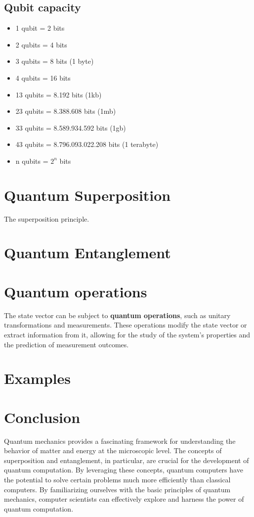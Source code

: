 		\subsection{Qubit capacity}
			\begin{itemize}
				\item 1 qubit = 2 bits
				\item 2 qubits = 4 bits
				\item 3 qubits = 8 bits (1 byte)
				\item 4 qubits = 16 bits
				\item 13 qubits = 8.192 bits (1kb)
				\item 23 qubits = 8.388.608 bits (1mb)
				\item 33 qubits = 8.589.934.592 bits (1gb)
				\item 43 qubits = 8.796.093.022.208 bits (1 terabyte)
				\item n qubits = $2^n$ bits
			\end{itemize}
		
	\section{Quantum Superposition}
		\par The superposition principle.

	\section{Quantum Entanglement}
	
	\section{Quantum operations}
		\label{sec:quantumOperations}
				
		\par The state vector can be subject to \textbf{quantum operations}, such as unitary transformations and measurements. These operations modify the state vector or extract information from it, allowing for the study of the system's properties and the prediction of measurement outcomes.
		
	\section{Examples}
	
	\section{Conclusion}
		\par Quantum mechanics provides a fascinating framework for understanding the behavior of matter and energy at the microscopic level. The concepts of superposition and entanglement, in particular, are crucial for the development of quantum computation. By leveraging these concepts, quantum computers have the potential to solve certain problems much more efficiently than classical computers. By familiarizing ourselves with the basic principles of quantum mechanics, computer scientists can effectively explore and harness the power of quantum computation.
	
	
	
